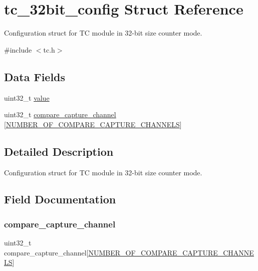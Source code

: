 \hypertarget{structtc__32bit__config}{}\section{tc\+\_\+32bit\+\_\+config Struct Reference}
\label{structtc__32bit__config}


Configuration struct for TC module in 32-\/bit size counter mode.  




{\ttfamily \#include $<$tc.\+h$>$}

\subsection*{Data Fields}
\begin{DoxyCompactItemize}
\item 
uint32\+\_\+t \mbox{\hyperlink{structtc__32bit__config_ae7f66047e6e39ba2bb6af8b95f00d1dd}{value}}
\item 
uint32\+\_\+t \mbox{\hyperlink{structtc__32bit__config_a4609d151acc2c6d829688f9a6c1f9972}{compare\+\_\+capture\+\_\+channel}} \mbox{[}\mbox{\hyperlink{group__asfdoc__sam0__tc__group_gac837f9db5df1793578c195a979c6a9d3}{N\+U\+M\+B\+E\+R\+\_\+\+O\+F\+\_\+\+C\+O\+M\+P\+A\+R\+E\+\_\+\+C\+A\+P\+T\+U\+R\+E\+\_\+\+C\+H\+A\+N\+N\+E\+LS}}\mbox{]}
\end{DoxyCompactItemize}


\subsection{Detailed Description}
Configuration struct for TC module in 32-\/bit size counter mode. 

\subsection{Field Documentation}
\mbox{\label{structtc__32bit__config_a4609d151acc2c6d829688f9a6c1f9972}} 
\subsubsection{\texorpdfstring{compare\_capture\_channel}{compare\_capture\_channel}}
{\footnotesize\ttfamily uint32\+\_\+t compare\+\_\+capture\+\_\+channel\mbox{[}\mbox{\hyperlink{group__asfdoc__sam0__tc__group_gac837f9db5df1793578c195a979c6a9d3}{N\+U\+M\+B\+E\+R\+\_\+\+O\+F\+\_\+\+C\+O\+M\+P\+A\+R\+E\+\_\+\+C\+A\+P\+T\+U\+R\+E\+\_\+\+C\+H\+A\+N\+N\+E\+LS}}\mbox{]}}


